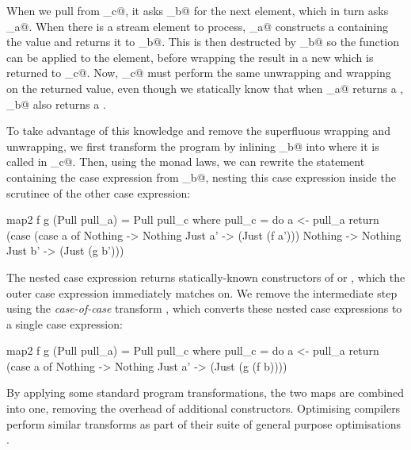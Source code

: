 When we pull from \Hs@pull_c@, it asks \Hs@pull_b@ for the next element, which in turn asks \Hs@pull_a@.
When there is a stream element to process, \Hs@pull_a@ constructs a \Hs@Just@ containing the value and returns it to \Hs@pull_b@.
This \Hs@Just@ is then destructed by \Hs@pull_b@ so the function \Hs@f@ can be applied to the element, before wrapping the result in a new \Hs@Just@ which is returned to \Hs@pull_c@.
Now, \Hs@pull_c@ must perform the same unwrapping and wrapping on the returned value, even though we statically know that when \Hs@pull_a@ returns a \Hs@Just@, \Hs@pull_b@ also returns a \Hs@Just@.

To take advantage of this knowledge and remove the superfluous wrapping and unwrapping, we first transform the program by inlining \Hs@pull_b@ into where it is called in \Hs@pull_c@.
Then, using the monad laws, we can rewrite the \Hs@return@ statement containing the case expression from \Hs@pull_b@, nesting this case expression inside the scrutinee of the other case expression:

\begin{haskell}
map2 f g (Pull pull_a) = Pull pull_c
 where
  pull_c = do
    a <- pull_a
    return (case (case a of
                   Nothing -> Nothing
                   Just a' -> (Just (f a')))
             Nothing -> Nothing
             Just b' -> (Just (g b')))
\end{haskell}

The nested case expression returns statically-known constructors of \Hs@Nothing@ or \Hs@Just@, which the outer case expression immediately matches on.
We remove the intermediate step using the \emph{case-of-case} transform \cite{jones1998transformation}, which converts these nested case expressions to a single case expression:

\begin{haskell}
map2 f g (Pull pull_a) = Pull pull_c
 where
  pull_c = do
    a <- pull_a
    return (case a of
             Nothing -> Nothing
             Just a' -> (Just (g (f b))))
\end{haskell}

By applying some standard program transformations, the two maps are combined into one, removing the overhead of additional constructors.
Optimising compilers perform similar transforms as part of their suite of general purpose optimisations \citep{jones1996compiling}.

